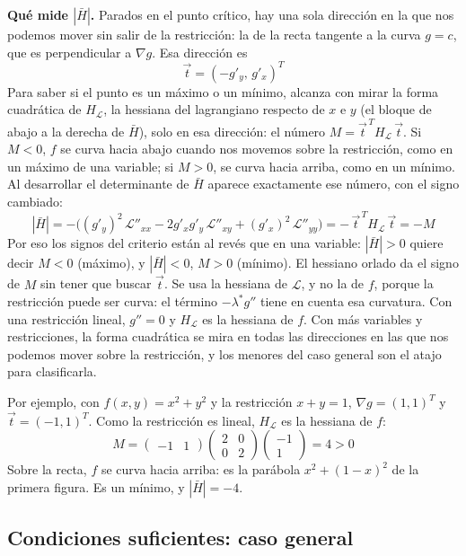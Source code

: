 \documentclass{article}
\newcommand{\vect}[1]{\vec{#1}}
\begin{document}
\noindent\textbf{Qué mide \(|\bar H|\).} Parados en el punto crítico, hay una sola dirección en la que nos podemos mover sin salir de la restricción: la de la recta tangente a la curva \(g=c\), que es perpendicular a \(\nabla g\). Esa dirección es
\[
\vect{t}=(-g'_y,\,g'_x)^T
\]
Para saber si el punto es un máximo o un mínimo, alcanza con mirar la forma cuadrática de \(H_{\mathcal L}\), la hessiana del lagrangiano respecto de \(x\) e \(y\) (el bloque de abajo a la derecha de \(\bar H\)), solo en esa dirección: el número \(M=\vect{t}^{\,T}H_{\mathcal L}\,\vect{t}\). Si \(M<0\), \(f\) se curva hacia abajo cuando nos movemos sobre la restricción, como en un máximo de una variable; si \(M>0\), se curva hacia arriba, como en un mínimo. Al desarrollar el determinante de \(\bar H\) aparece exactamente ese número, con el signo cambiado:
\[
|\bar H|=-\bigl((g'_y)^2\,\mathcal L''_{xx}-2g'_xg'_y\,\mathcal L''_{xy}+(g'_x)^2\,\mathcal L''_{yy}\bigr)=-\,\vect{t}^{\,T}H_{\mathcal L}\,\vect{t}=-M
\]
Por eso los signos del criterio están al revés que en una variable: \(|\bar H|>0\) quiere decir \(M<0\) (máximo), y \(|\bar H|<0\), \(M>0\) (mínimo). El hessiano orlado da el signo de \(M\) sin tener que buscar \(\vect{t}\). Se usa la hessiana de \(\mathcal L\), y no la de \(f\), porque la restricción puede ser curva: el término \(-\lambda^*g''\) tiene en cuenta esa curvatura. Con una restricción lineal, \(g''=0\) y \(H_{\mathcal L}\) es la hessiana de \(f\). Con más variables y restricciones, la forma cuadrática se mira en todas las direcciones en las que nos podemos mover sobre la restricción, y los menores del caso general son el atajo para clasificarla.

Por ejemplo, con \(f(x,y)=x^2+y^2\) y la restricción \(x+y=1\), \(\nabla g=(1,1)^T\) y \(\vect{t}=(-1,1)^T\). Como la restricción es lineal, \(H_{\mathcal L}\) es la hessiana de \(f\):
\[
M=\begin{pmatrix}-1 & 1\end{pmatrix}\begin{pmatrix}2 & 0\\ 0 & 2\end{pmatrix}\begin{pmatrix}-1\\ 1\end{pmatrix}=4>0
\]
Sobre la recta, \(f\) se curva hacia arriba: es la parábola \(x^2+(1-x)^2\) de la primera figura. Es un mínimo, y \(|\bar H|=-4\).

\subsection*{Condiciones suficientes: caso general}
\end{document}
